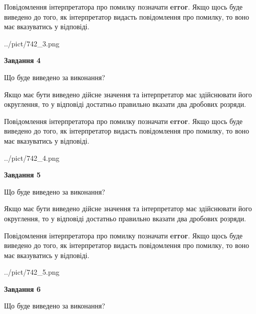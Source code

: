 \documentclass[12pt, ukrainian]{article}
\begin{document}
{\begin {Large}
Повідомлення інтерпретатора про помилку позначати \textbf{error}.
Якщо щось буде виведено до того, як інтерпретатор видасть повідомлення про помилку, 
то воно має вказуватись у відповіді. \par

\begin{center}
	{../pict/742_3.png}
\end{center}
\newpage

{\begin {center}\textbf{Завдання 4}\end {center}}\par
Що буде виведено за виконання? \par

Якщо має бути виведено дійсне значення та інтерпретатор має здійснювати його округлення, 
то у відповіді достатньо правильно вказати два дробових розряди.

Повідомлення інтерпретатора про помилку позначати \textbf{error}.
Якщо щось буде виведено до того, як інтерпретатор видасть повідомлення про помилку, 
то воно має вказуватись у відповіді. \par

\begin{center}
	{../pict/742_4.png}
\end{center}
\newpage

{\begin {center}\textbf{Завдання 5}\end {center}}\par
Що буде виведено за виконання? \par

Якщо має бути виведено дійсне значення та інтерпретатор має здійснювати його округлення, 
то у відповіді достатньо правильно вказати два дробових розряди.

Повідомлення інтерпретатора про помилку позначати \textbf{error}.
Якщо щось буде виведено до того, як інтерпретатор видасть повідомлення про помилку, 
то воно має вказуватись у відповіді. \par

\begin{center}
	{../pict/742_5.png}
\end{center}
\newpage

{\begin {center}\textbf{Завдання 6}\end {center}}\par
Що буде виведено за виконання? \par


\end{Large}}
\end{document}

